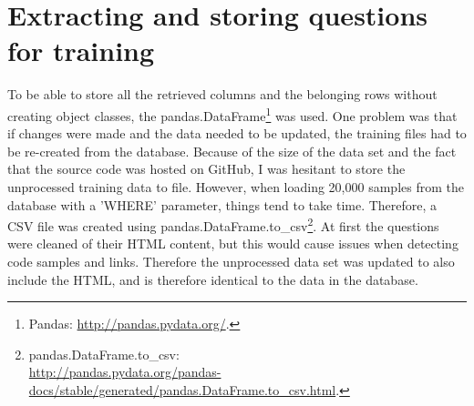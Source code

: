 \section{Extracting and storing questions for training} 
\label{sec:extraction_storing_questions}
To be able to store all the retrieved columns and the belonging rows without creating object classes, the pandas.DataFrame\footnote{
	Pandas: \url{http://pandas.pydata.org/}.
} 
was used.
One problem was that if changes were made and the data needed to be updated, the training files had to be re-created from the database. 
Because of the size of the data set and the fact that the source code was hosted on GitHub, I was hesitant to store the unprocessed training data to file.
However, when loading 20,000 samples from the database with a 'WHERE' parameter, things tend to take time. 
Therefore, a CSV file was created using pandas.DataFrame.to\_csv\footnote{
	pandas.DataFrame.to\_csv: \\
	\url{http://pandas.pydata.org/pandas-docs/stable/generated/pandas.DataFrame.to_csv.html}.
}. 
At first the questions were cleaned of their HTML content, but this would cause issues when detecting code samples and links. 
Therefore the unprocessed data set was updated to also include the HTML, and is therefore identical to the data in the database.

